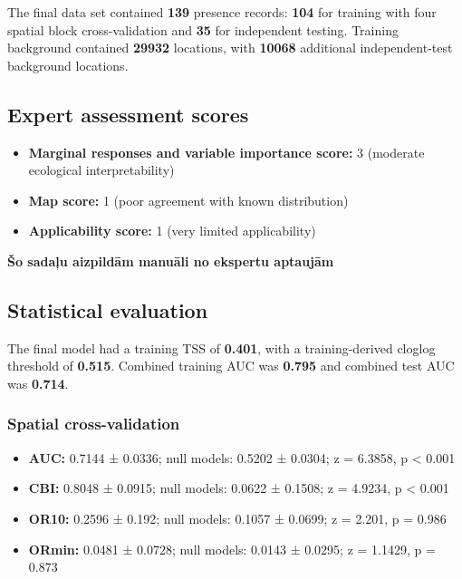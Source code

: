 \documentclass[
  openany]{book}
\providecommand{\tightlist}{%
  \setlength{\itemsep}{0pt}\setlength{\parskip}{0pt}}
\providecommand{\tightlist}{%
  \setlength{\itemsep}{0pt}%
  \setlength{\parskip}{0pt}%
}
\begin{document}
The final data set contained \textbf{139} presence records: \textbf{104} for training with four spatial block cross-validation and \textbf{35} for independent testing. Training background contained \textbf{29932} locations, with \textbf{10068} additional independent-test background locations.

\subsection*{Expert assessment scores}\label{expert-assessment-scores-1}

\begin{itemize}
\tightlist
\item
  \textbf{Marginal responses and variable importance score:} 3 (moderate ecological interpretability)
\item
  \textbf{Map score:} 1 (poor agreement with known distribution)
\item
  \textbf{Applicability score:} 1 (very limited applicability)
\end{itemize}

\textbf{Šo sadaļu aizpildām manuāli no ekspertu aptaujām}

\subsection*{Statistical evaluation}\label{statistical-evaluation-1}

The final model had a training TSS of \textbf{0.401}, with a training-derived cloglog threshold of \textbf{0.515}. Combined training AUC was \textbf{0.795} and combined test AUC was \textbf{0.714}.

\subsubsection*{Spatial cross-validation}\label{spatial-cross-validation-1}

\begin{itemize}
\tightlist
\item
  \textbf{AUC:} 0.7144 ± 0.0336; null models: 0.5202 ± 0.0304; z = 6.3858, p \textless{} 0.001
\item
  \textbf{CBI:} 0.8048 ± 0.0915; null models: 0.0622 ± 0.1508; z = 4.9234, p \textless{} 0.001
\item
  \textbf{OR10:} 0.2596 ± 0.192; null models: 0.1057 ± 0.0699; z = 2.201, p = 0.986
\item
  \textbf{ORmin:} 0.0481 ± 0.0728; null models: 0.0143 ± 0.0295; z = 1.1429, p = 0.873
\end{itemize}
\end{document}
